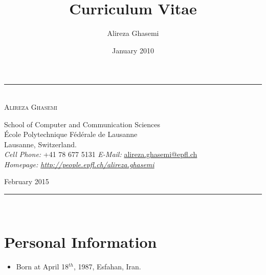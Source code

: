 \documentclass[a4paper]{article}
\title{Curriculum Vitae}
\date{January 2010}
\author{Alireza Ghasemi}
\newcounter{prob_num}
\newcommand{\HRule}{\rule{\linewidth}{0.5mm}}
\theoremstyle{definition}
\begin{document}
\begin{center}
\HRule \\[0.2cm]

{ \Huge{{\textsc{Alireza Ghasemi}}}}\\[0.2cm]

\begin{center} 
{\small School of Computer and Communication Sciences\\
\'{E}cole Polytechnique F\'{e}d\'{e}rale de Lausanne\\
Lausanne, Switzerland.\\[0.2cm]

\emph{Cell Phone:} +41 78 677 5131 \hfill
\emph{E-Mail:} \href{mailto:alireza.ghasemi@epfl.ch}{alireza.ghasemi@epfl.ch}\\
\emph{Homepage: \url{http://people.epfl.ch/alireza.ghasemi}} }

\end{center}
{\large February 2015}\\[0.2cm]
\HRule \\[0.2cm]

\end{center}

\setcounter{prob_num}{1}
\newcommand{\hlmar}[1]{\it{#1}\marginpar{#1}}
\section{Personal Information}
\begin{itemize}
\item Born at April 18$^{th}$, 1987, Esfahan, Iran.\\
\end{itemize}
\end{document}
